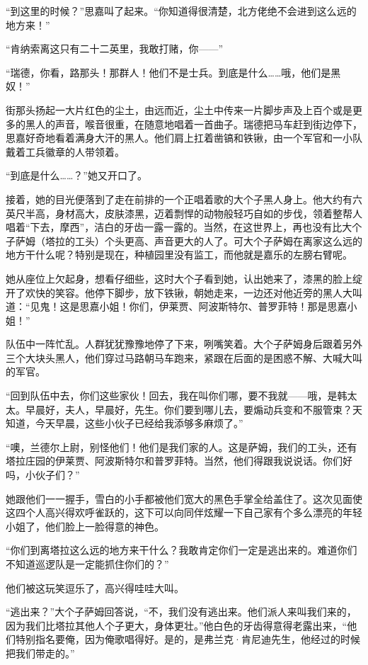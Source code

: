 \par “到这里的时候？”思嘉叫了起来。“你知道得很清楚，北方佬绝不会进到这么远的地方来！”
\par “肯纳索离这只有二十二英里，我敢打赌，你——”
\par “瑞德，你看，路那头！那群人！他们不是士兵。到底是什么……哦，他们是黑奴！”
\par 街那头扬起一大片红色的尘土，由远而近，尘土中传来一片脚步声及上百个或是更多的黑人的声音，喉音很重，在随意地唱着一首曲子。瑞德把马车赶到街边停下，思嘉好奇地看着满身大汗的黑人。他们肩上扛着凿镐和铁锹，由一个军官和一小队戴着工兵徽章的人带领着。
\par “到底是什么……？”她又开口了。
\par 接着，她的目光便落到了走在前排的一个正唱着歌的大个子黑人身上。他大约有六英尺半高，身材高大，皮肤漆黑，迈着剽悍的动物般轻巧自如的步伐，领着整帮人唱着“下去，摩西”，洁白的牙齿一露一露的。当然，在这世界上，再也没有比大个子萨姆（塔拉的工头）个头更高、声音更大的人了。可大个子萨姆在离家这么远的地方干什么呢？特别是现在，种植园里没有监工，而他就是嘉乐的左膀右臂呢。
\par 她从座位上欠起身，想看仔细些，这时大个子看到她，认出她来了，漆黑的脸上绽开了欢快的笑容。他停下脚步，放下铁锹，朝她走来，一边还对他近旁的黑人大叫道：“见鬼！这是思嘉小姐！你们，伊莱贾、阿波斯特尔、普罗菲特！那是思嘉小姐！”
\par 队伍中一阵忙乱。人群犹犹豫豫地停了下来，咧嘴笑着。大个子萨姆身后跟着另外三个大块头黑人，他们穿过马路朝马车跑来，紧跟在后面的是困惑不解、大喊大叫的军官。
\par “回到队伍中去，你们这些家伙！回去，我在叫你们哪，要不我就——哦，是韩太太。早晨好，夫人，早晨好，先生。你们要到哪儿去，要煽动兵变和不服管束？天知道，今天早晨，这些小伙子已经给我添够多麻烦了。”
\par “噢，兰德尔上尉，别怪他们！他们是我们家的人。这是萨姆，我们的工头，还有塔拉庄园的伊莱贾、阿波斯特尔和普罗菲特。当然，他们得跟我说说话。你们好吗，小伙子们？”
\par 她跟他们一一握手，雪白的小手都被他们宽大的黑色手掌全给盖住了。这次见面使这四个人高兴得欢呼雀跃的，这下可以向同伴炫耀一下自己家有个多么漂亮的年轻小姐了，他们脸上一脸得意的神色。
\par “你们到离塔拉这么远的地方来干什么？我敢肯定你们一定是逃出来的。难道你们不知道巡逻队是一定能抓住你们的？”
\par 他们被这玩笑逗乐了，高兴得哇哇大叫。
\par “逃出来？”大个子萨姆回答说，“不，我们没有逃出来。他们派人来叫我们来的，因为我们比塔拉其他人个子更大，身体更壮。”他白色的牙齿得意得老露出来，“他们特别指名要俺，因为俺歌唱得好。是的，是弗兰克·肯尼迪先生，他经过的时候把我们带走的。”
